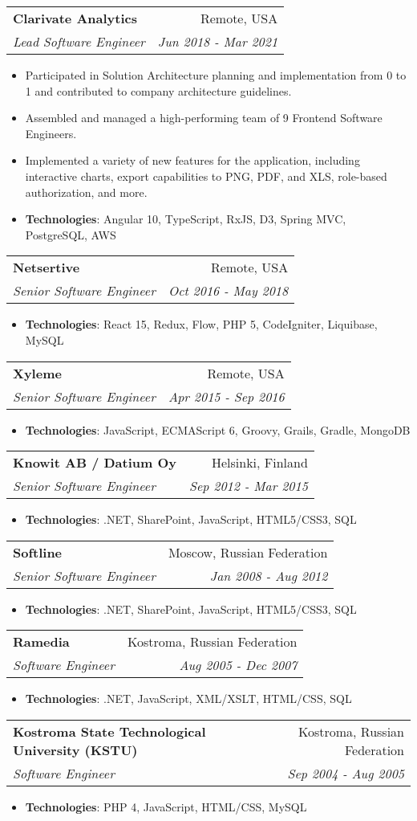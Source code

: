 \documentclass[a4paper,11pt]{article}
\makeatletter
\newcommand{\resumeItem}[2]{
  \item\small{
    \textbf{#1}{: #2 \vspace{-2pt}}
  }
}
\newcommand{\resumeItemNoIntro}[1]{
  \item\small{
    {#1 \vspace{-2pt}}
  }
}
\newcommand{\resumeSubheading}[4]{
  \vspace{-1pt}\item
    \begin{tabular*}{0.97\textwidth}[t]{l@{\extracolsep{\fill}}r}
      \textbf{#1} & #2 \\
      \textit{\small#3} & \textit{\small #4} \\
    \end{tabular*}\vspace{-5pt}
}
\newcommand{\resumeItemListStart}{\begin{itemize}}
\newcommand{\resumeItemListEnd}{\end{itemize}\vspace{-5pt}}
\makeatother
\begin{document}
    \resumeSubheading
      {Clarivate Analytics}{Remote, USA}
      {Lead Software Engineer}{Jun 2018 - Mar 2021}
      \resumeItemListStart
        \resumeItemNoIntro
          {Participated in Solution Architecture planning and implementation from 0 to 1 and contributed to company architecture guidelines.}
        \resumeItemNoIntro
          {Assembled and managed a high-performing team of 9 Frontend Software Engineers.}
        \resumeItemNoIntro
          {Implemented a variety of new features for the application, including interactive charts, export capabilities to PNG, PDF, and XLS, role-based authorization, and more.}
        \resumeItem{Technologies}
          {Angular 10, TypeScript, RxJS, D3, Spring MVC, PostgreSQL, AWS}
      \resumeItemListEnd          

    \resumeSubheading
      {Netsertive}{Remote, USA}
      {Senior Software Engineer}{Oct 2016 - May 2018}
      \resumeItemListStart
        \resumeItem{Technologies}
          {React 15, Redux, Flow, PHP 5, CodeIgniter, Liquibase, MySQL}
      \resumeItemListEnd   

    \resumeSubheading
      {Xyleme}{Remote, USA}
      {Senior Software Engineer}{Apr 2015 - Sep 2016}
      \resumeItemListStart
        \resumeItem{Technologies}
          {JavaScript, ECMAScript 6, Groovy, Grails, Gradle, MongoDB}
      \resumeItemListEnd   

    \resumeSubheading
      {Knowit AB / Datium Oy}{Helsinki, Finland}
      {Senior Software Engineer}{Sep 2012 - Mar 2015}
      \resumeItemListStart
        \resumeItem{Technologies}
          {.NET, SharePoint, JavaScript, HTML5/CSS3, SQL}
      \resumeItemListEnd   

    \resumeSubheading
      {Softline}{Moscow, Russian Federation}
      {Senior Software Engineer}{Jan 2008 - Aug 2012}
      \resumeItemListStart
        \resumeItem{Technologies}
          {.NET, SharePoint, JavaScript, HTML5/CSS3, SQL}
      \resumeItemListEnd         

    \resumeSubheading
      {Ramedia}{Kostroma, Russian Federation}
      {Software Engineer}{Aug 2005 - Dec 2007}
      \resumeItemListStart
        \resumeItem{Technologies}
          {.NET, JavaScript, XML/XSLT, HTML/CSS, SQL}
      \resumeItemListEnd    

    \resumeSubheading
      {Kostroma State Technological University (KSTU)}{Kostroma, Russian Federation}
      {Software Engineer}{Sep 2004 - Aug 2005}
      \resumeItemListStart
        \resumeItem{Technologies}
          {PHP 4, JavaScript, HTML/CSS, MySQL}
      \resumeItemListEnd        
      
\end{document}
